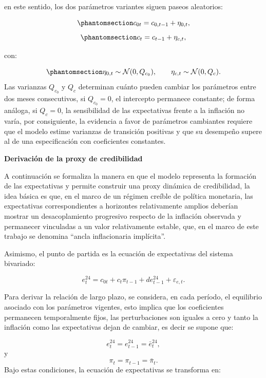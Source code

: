 \documentclass[
  10.5pt,
  letterpaper,
  twocolumn]{article}
\begin{document}
en este sentido, los dos parámetros variantes siguen paseos aleatorios:

\begin{equation}\phantomsection\label{eq-transicion-c0}{c_{0t}=c_{0,t-1}+\eta_{0,t},}\end{equation}\begin{equation}\phantomsection\label{eq-transicion-c}{c_t=c_{t-1}+\eta_{c,t},}\end{equation}

con:

\begin{equation}\phantomsection\label{eq-varianzas-estado}{\eta_{0,t}\sim\mathcal{N}(0,Q_{c_0}),\qquad\eta_{c,t}\sim\mathcal{N}(0,Q_c).}\end{equation}
Las varianzas \(Q_{c_0}\) y \(Q_c\) determinan cuánto pueden cambiar los
parámetros entre dos meses consecutivos, si \(Q_{c_0}=0\), el intercepto
permanece constante; de forma análoga, si \(Q_c=0\), la sensibilidad de
las expectativas frente a la inflación no varía, por consiguiente, la
evidencia a favor de parámetros cambiantes requiere que el modelo estime
varianzas de transición positivas y que su desempeño supere al de una
especificación con coeficientes constantes.

\textbf{Derivación de la proxy de credibilidad}

A continuación se formaliza la manera en que el modelo representa la
formación de las expectativas y permite construir una proxy dinámica de
credibilidad, la idea básica es que, en el marco de un régimen creíble
de política monetaria, las expectativas correspondientes a horizontes
relativamente amplios deberían mostrar un desacoplamiento progresivo
respecto de la inflación observada y permanecer vinculadas a un valor
relativamente estable, que, en el marco de este trabajo se denomina
``ancla inflacionaria implícita''.

Asimismo, el punto de partida es la ecuación de expectativas del sistema
bivariado:

\[
e_t^{24}
=
c_{0t}
+
c_t\pi_{t-1}
+
d e_{t-1}^{24}
+
\varepsilon_{e,t}.
\]

Para derivar la relación de largo plazo, se considera, en cada período,
el equilibrio asociado con los parámetros vigentes, esto implica que los
coeficientes permanecen temporalmente fijos, las perturbaciones son
iguales a cero y tanto la inflación como las expectativas dejan de
cambiar, es decir se supone que:

\[
e_t^{24}
=
e_{t-1}^{24}
=
\bar e_t^{24},
\] y \[
\pi_t
=
\pi_{t-1}
=
\bar\pi_t.
\] Bajo estas condiciones, la ecuación de expectativas se transforma en:
\end{document}
